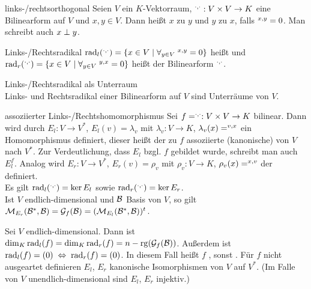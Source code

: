 \begin{Def}{links-/rechtsorthogonal}
    Seien $V$ ein $K$-Vektorraum, $\sp{\cdot, \cdot}: V \times V \rightarrow K$
    eine Bilinearform auf $V$ und $x, y \in V$.
    Dann heißt $x$  zu $y$ und $y$
     zu $x$, falls $\sp{x, y} = 0$.
    Man schreibt auch $x \;\bot\; y$.
\end{Def}

\begin{Def}{Links-/Rechtsradikal}
    $\operatorname{rad}_l(\sp{\cdot, \cdot}) = \{x \in V \;|\;
    \forall_{y \in V}\; \sp{x, y} = 0\}$
    heißt  und
    $\operatorname{rad}_r(\sp{\cdot, \cdot}) = \{x \in V \;|\;
    \forall_{y \in V}\; \sp{y, x} = 0\}$
    heißt  der Bilinearform $\sp{\cdot, \cdot}$.
\end{Def}

\begin{Satz}{Links-/Rechtsradikal als Unterraum} \\
    Links- und Rechtsradikal einer Bilinearform auf $V$ sind Unterräume von
    $V$.
\end{Satz}

\begin{Satz}{assoziierter Links-/Rechtshomomorphismus}
    Sei $f = \sp{\cdot, \cdot}: V \times V \rightarrow K$ bilinear.
    Dann wird durch
    $E_l: V \rightarrow V^\ast$, $E_l(v) = \lambda_v$ mit
    $\lambda_v: V \rightarrow K$, $\lambda_v(x) = \sp{v, x}$
    ein Homomorphismus definiert, dieser heißt der zu $f$ assoziierte
    (kanonische)  von $V$ nach $V^\ast$.
    Zur Verdeutlichung, dass $E_l$ bzgl. $f$ gebildet wurde, schreibt man
    auch $E_l^f$.
    Analog wird $E_r: V \rightarrow V^\ast$, $E_r(v) = \rho_v$ mit
    $\rho_v: V \rightarrow K$, $\rho_v(x) = \sp{x, v}$
    der  definiert. \\
    Es gilt $\operatorname{rad}_l(\sp{\cdot, \cdot}) = \ker E_l$ sowie
    $\operatorname{rad}_r(\sp{\cdot, \cdot}) = \ker E_r$. \\
    Ist $V$ endlich-dimensional und $\mathcal{B}$ Basis von $V$, so gilt
    $\mathcal{M}_{E_r}(\mathcal{B^\ast},\mathcal{B}) = \mathcal{G}_f(\mathcal{B}) =
    (\mathcal{M}_{E_l}(\mathcal{B^\ast},\mathcal{B}))^t$.
\end{Satz}

\begin{Kor}
    Sei $V$ endlich-dimensional.
    Dann ist $\dim_K \operatorname{rad}_l(f) = \dim_K \operatorname{rad}_r(f) =
    n - \operatorname{rg}(\mathcal{G}_f(\mathcal{B}))$.
    Außerdem ist $\operatorname{rad}_l(f) = (0) \;\Leftrightarrow\; \operatorname{rad}_r(f) = (0)$.
    In diesem Fall heißt $f$ , sonst
    .
    Für $f$ nicht ausgeartet definieren $E_l$, $E_r$ kanonische Isomorphismen
    von $V$ auf $V^\ast$.
    (Im Falle von $V$ unendlich-dimensional sind $E_l$, $E_r$ injektiv.)
\end{Kor}

